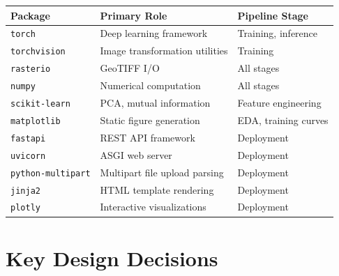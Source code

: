 \documentclass[12pt, a4paper]{article}
\begin{document}
\begin{center}
\renewcommand{\arraystretch}{1.25}
\begin{tabular}{lll}
\toprule
\textbf{Package} & \textbf{Primary Role} & \textbf{Pipeline Stage} \\
\midrule
\texttt{torch}            & Deep learning framework       & Training, inference \\
\texttt{torchvision}      & Image transformation utilities & Training \\
\texttt{rasterio}         & GeoTIFF I/O                   & All stages \\
\texttt{numpy}            & Numerical computation          & All stages \\
\texttt{scikit-learn}     & PCA, mutual information        & Feature engineering \\
\texttt{matplotlib}       & Static figure generation       & EDA, training curves \\
\texttt{fastapi}          & REST API framework             & Deployment \\
\texttt{uvicorn}          & ASGI web server                & Deployment \\
\texttt{python-multipart} & Multipart file upload parsing  & Deployment \\
\texttt{jinja2}           & HTML template rendering        & Deployment \\
\texttt{plotly}           & Interactive visualizations     & Deployment \\
\bottomrule
\end{tabular}
\end{center}

\section{Key Design Decisions}
\end{document}
